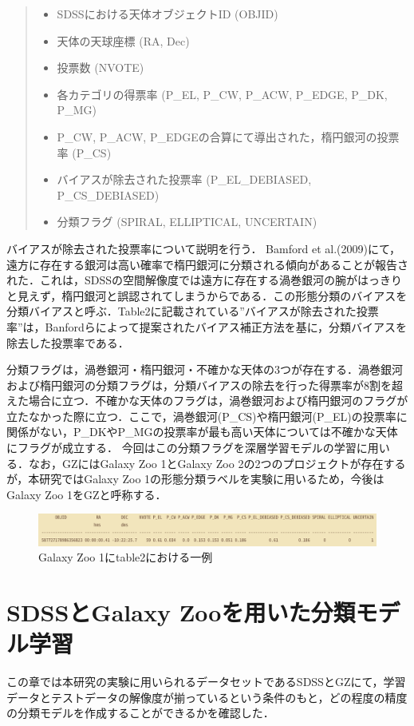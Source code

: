 \documentclass[a4j, 11pt]{jreport}
\begin{document}
\begin{quote}
  \begin{itemize}
   \item SDSSにおける天体オブジェクトID (OBJID)
   \item 天体の天球座標 (RA, Dec)
   \item 投票数 (NVOTE)
   \item 各カテゴリの得票率 (P\_EL, P\_CW, P\_ACW, P\_EDGE, P\_DK, P\_MG)
   \item P\_CW, P\_ACW, P\_EDGEの合算にて導出された，楕円銀河の投票率 (P\_CS)
   \item バイアスが除去された投票率 (P\_EL\_DEBIASED, P\_CS\_DEBIASED)
   \item 分類フラグ (SPIRAL, ELLIPTICAL, UNCERTAIN)
  \end{itemize}
\end{quote}

バイアスが除去された投票率について説明を行う．
Bamford et al.(2009)\cite{Bamford2009}にて，遠方に存在する銀河は高い確率で楕円銀河に分類される傾向があることが報告された．これは，SDSSの空間解像度では遠方に存在する渦巻銀河の腕がはっきりと見えず，楕円銀河と誤認されてしまうからである．この形態分類のバイアスを分類バイアスと呼ぶ．Table2に記載されている''バイアスが除去された投票率''は，Banfordらによって提案されたバイアス補正方法を基に，分類バイアスを除去した投票率である．

分類フラグは，渦巻銀河・楕円銀河・不確かな天体の3つが存在する．渦巻銀河および楕円銀河の分類フラグは，分類バイアスの除去を行った得票率が8割を超えた場合に立つ．不確かな天体のフラグは，渦巻銀河および楕円銀河のフラグが立たなかった際に立つ．ここで，渦巻銀河(P\_CS)や楕円銀河(P\_EL)の投票率に関係がない，P\_DKやP\_MGの投票率が最も高い天体については不確かな天体にフラグが成立する．
今回はこの分類フラグを深層学習モデルの学習に用いる．なお，GZにはGalaxy Zoo 1とGalaxy Zoo 2の2つのプロジェクトが存在するが，本研究ではGalaxy Zoo 1の形態分類ラベルを実験に用いるため，今後はGalaxy Zoo 1をGZと呼称する．

\begin{figure}[h]
 \centering
 \includegraphics[width=18cm]{images/table2.png}
 \caption{Galaxy Zoo 1にtable2における一例}
 \label{fig:table2}
\end{figure}

\newpage
\chapter{SDSSとGalaxy Zooを用いた分類モデル学習}
この章では本研究の実験に用いられるデータセットであるSDSSとGZにて，学習データとテストデータの解像度が揃っているという条件のもと，どの程度の精度の分類モデルを作成することができるかを確認した．
\end{document}
